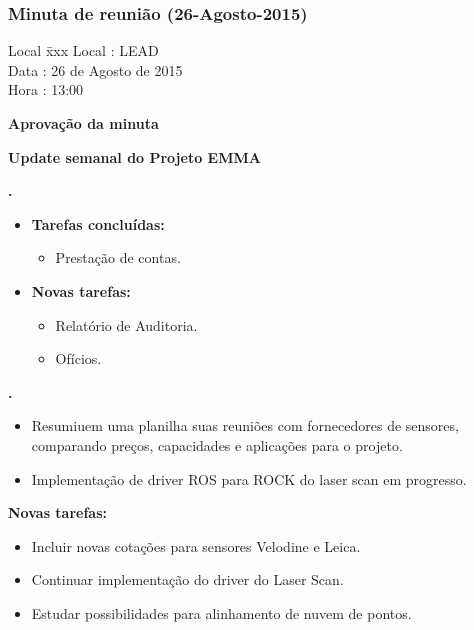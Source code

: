 \subsubsection{Minuta de reunião (26-Agosto-2015)}

\begin{tabbing}
  Local \= xxx \kill
  Local \> : LEAD \\
  Data  \> : 26 de Agosto de 2015 \\
  Hora  \> : 13:00
\end{tabbing}


\textbf{Aprovação da minuta}

\textbf{Update semanal do Projeto EMMA}
   							
\textbf{\alana.} 
	\begin{itemize}
		\item \textbf{Tarefas concluídas:}
			\begin{itemize}    
				\item Prestação de contas.
			\end{itemize}
		
		\item \textbf{Novas tarefas:}
			\begin{itemize} 
				\item Relatório de Auditoria.
				\item Ofícios.
			\end{itemize}
	\end{itemize}   		
						
\textbf{\gabriel.} 
	\begin{itemize}
			\item Resumiuem uma planilha suas reuniões com fornecedores de sensores,
			comparando preços, capacidades e aplicações para o projeto.
			\item Implementação de driver ROS para ROCK do laser scan em progresso.
			\end{itemize}
		
		\item \textbf{Novas tarefas:}
			\begin{itemize} 
				\item Incluir novas cotações para sensores Velodine e Leica.
				\item Continuar implementação do driver do Laser Scan.
				\item Estudar possibilidades para alinhamento de nuvem de pontos.
			\end{itemize}

